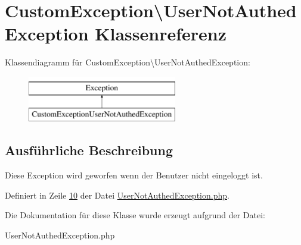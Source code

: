\hypertarget{class_custom_exception_1_1_user_not_authed_exception}{\section{Custom\-Exception\textbackslash{}User\-Not\-Authed\-Exception Klassenreferenz}
\label{class_custom_exception_1_1_user_not_authed_exception}
}
Klassendiagramm für Custom\-Exception\textbackslash{}User\-Not\-Authed\-Exception\-:\begin{figure}[H]
\begin{center}
\leavevmode
\includegraphics[height=2.000000cm]{class_custom_exception_1_1_user_not_authed_exception}
\end{center}
\end{figure}


\subsection{Ausführliche Beschreibung}
Diese Exception wird geworfen wenn der Benutzer nicht eingeloggt ist. 

Definiert in Zeile \hyperlink{_user_not_authed_exception_8php_source_l00010}{10} der Datei \hyperlink{_user_not_authed_exception_8php_source}{User\-Not\-Authed\-Exception.\-php}.



Die Dokumentation für diese Klasse wurde erzeugt aufgrund der Datei\-:\begin{DoxyCompactItemize}
\item 
User\-Not\-Authed\-Exception.\-php\end{DoxyCompactItemize}
